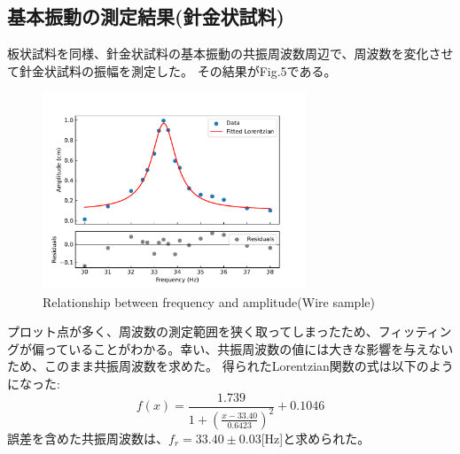 \documentclass[a4paper,11pt]{jsarticle}
\begin{document}
\subsection{基本振動の測定結果(針金状試料)}
板状試料を同様、針金状試料の基本振動の共振周波数周辺で、周波数を変化させて針金状試料の振幅を測定した。
その結果がFig.5である。
\begin{figure}[H]
  \centering
  \includegraphics[width=0.7\textwidth]{figs/fitting_Lorentzian2.pdf}
  \caption{Relationship between frequency and amplitude(Wire sample)}
\end{figure}
プロット点が多く、周波数の測定範囲を狭く取ってしまったため、フィッティングが偏っていることがわかる。幸い、共振周波数の値には大きな影響を与えないため、このまま共振周波数を求めた。
得られたLorentzian関数の式は以下のようになった:
\begin{equation}
  f(x) = \frac{1.739}{1 + (\frac{x - 33.40}{0.6423})^2} + 0.1046
\end{equation}
誤差を含めた共振周波数は、$f_r = 33.40 \pm 0.03$[Hz]と求められた。
\end{document}
